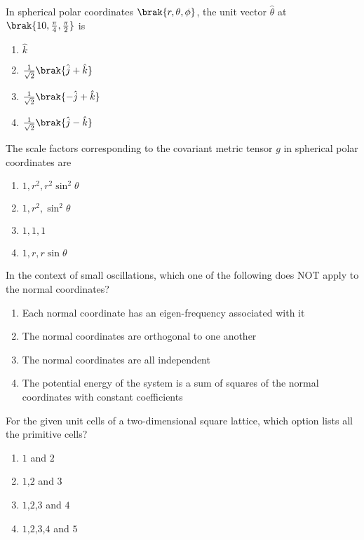 \item In spherical polar coordinates $ \brak{r, \theta, \phi} $, the unit vector $\hat{\theta}$ at $\brak{10, \frac{\pi}{4}, \frac{\pi}{2}}$ is
\begin{enumerate}
    \item $\hat{k}$
    \item $\frac{1}{\sqrt{2}} \brak{\hat{j} + \hat{k}}$
    \item $\frac{1}{\sqrt{2}} \brak{-\hat{j} + \hat{k}}$
    \item $\frac{1}{\sqrt{2}} \brak{\hat{j} - \hat{k}}$
\end{enumerate}

\item The scale factors corresponding to the covariant metric tensor $g$ in spherical polar coordinates are
\begin{enumerate}
    \item $1, r^2, r^2 \sin^2 \theta$
    \item $1, r^2, \sin^2 \theta$
    \item $1, 1, 1$
    \item $1, r, r \sin \theta$
\end{enumerate}

\item In the context of small oscillations, which one of the following does NOT apply to the normal coordinates?
\begin{enumerate}
    \item Each normal coordinate has an eigen-frequency associated with it
    \item The normal coordinates are orthogonal to one another
    \item The normal coordinates are all independent
    \item The potential energy of the system is a sum of squares of the normal coordinates with constant coefficients
\end{enumerate}

\item For the given unit cells of a two-dimensional square lattice, which option lists all the primitive cells?\\

\begin{enumerate}
    \item $1$ and $2$
    \item $1$,$2$ and $3$
  \item $1$,$2$,$3$ and $4$
   \item  $1$,$2$,$3$,$4$ and $5$
\end{enumerate}

